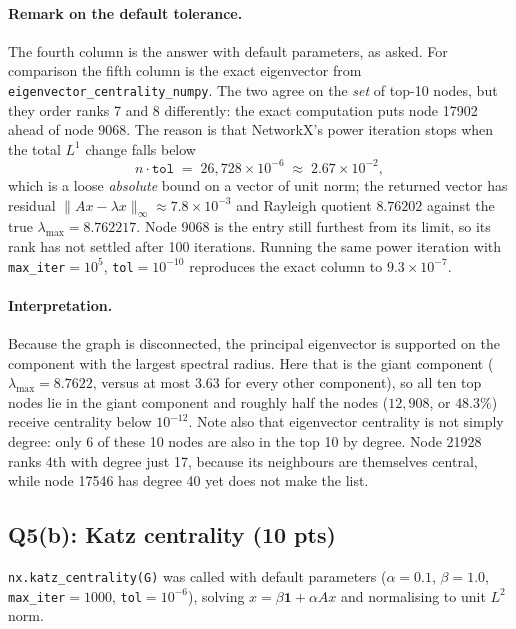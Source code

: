 \paragraph{Remark on the default tolerance.}
The fourth column is the answer with default parameters, as asked. For comparison
the fifth column is the exact eigenvector from
\texttt{eigenvector\_\-centrality\_\-numpy}. The two agree on the \emph{set} of
top-10 nodes, but they order ranks 7 and 8 differently: the exact computation puts
node 17902 ahead of node 9068. The reason is that NetworkX's power iteration stops
when the total $L^1$ change falls below
\[
  n\cdot\texttt{tol} \;=\; 26{,}728\times10^{-6} \;\approx\; 2.67\times10^{-2},
\]
which is a loose \emph{absolute} bound on a vector of unit norm; the returned
vector has residual $\lVert Ax-\lambda x\rVert_\infty\approx7.8\times10^{-3}$ and
Rayleigh quotient $8.76202$ against the true
$\lambda_{\max}=8.762217$. Node 9068 is the entry still
furthest from its limit, so its rank has not settled after 100 iterations. Running
the same power iteration with \texttt{max\_iter}$=10^5$, \texttt{tol}$=10^{-10}$
reproduces the exact column to $9.3\times10^{-7}$.

\paragraph{Interpretation.}
Because the graph is disconnected, the principal eigenvector is supported on the
component with the largest spectral radius. Here that is the giant component
($\lambda_{\max}=8.7622$, versus at most $3.63$ for every other component), so all
ten top nodes lie in the giant component and roughly half the nodes
($12{,}908$, or $48.3\%$) receive centrality below $10^{-12}$. Note also that
eigenvector centrality is not simply degree: only 6 of these 10 nodes are also in
the top 10 by degree. Node 21928 ranks 4th with degree just 17, because its
neighbours are themselves central, while node 17546 has degree 40 yet does not
make the list.

\subsection*{Q5(b): Katz centrality (10 pts)}

\texttt{nx.katz\_centrality(G)} was called with default parameters
($\alpha=0.1$, $\beta=1.0$, \texttt{max\_iter}$=1000$, \texttt{tol}$=10^{-6}$),
solving $x=\beta\mathbf{1}+\alpha Ax$ and normalising to unit $L^2$ norm.

